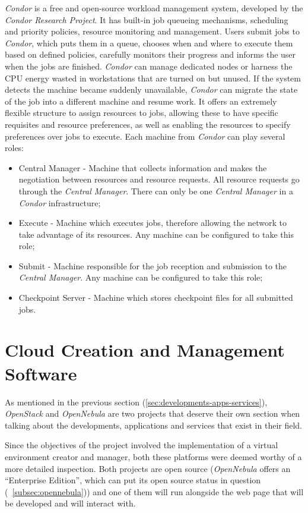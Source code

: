 \textit{Condor} is a free and open-source workload management system, developed by the \textit{Condor Research Project}.
It has built-in job queueing mechanisms, scheduling and priority policies, resource monitoring and management. Users submit jobs to \textit{Condor}, which puts them in a queue, chooses when and where to execute them based on defined policies, carefully monitors their progress and informs the user when the jobs are finished.
\textit{Condor} can manage dedicated nodes or harness the CPU energy wasted in workstations that are turned on but unused. If the system detects the machine became suddenly unavailable, \textit{Condor} can migrate the state of the job into a different machine and resume work. 
It offers an extremely flexible structure to assign resources to jobs, allowing these to have specific requisites and resource preferences, as well as enabling the resources to specify preferences over jobs to execute.
Each machine from \textit{Condor} can play several roles:
\begin{itemize}
\item Central Manager - Machine that collects information and makes the negotiation between resources and resource requests. All resource requests go through the \textit{Central Manager}. There can only be one \textit{Central Manager} in a \textit{Condor} infrastructure;
\item Execute - Machine which executes jobs, therefore allowing the network to take advantage of its resources. Any machine can be configured to take this role;
\item Submit - Machine responsible for the job reception and submission to the \textit{Central Manager}. Any machine can be configured to take this role;
\item Checkpoint Server - Machine which stores checkpoint files for all submitted jobs.\cite{jorge-ruao,condor}
\end{itemize}


\section{Cloud Creation and Management Software}\label{sec:stack-nebula}

As mentioned in the previous section (\ref{sec:developments-apps-services}), \textit{OpenStack} and \textit{OpenNebula} are two projects that deserve their own section when talking about the developments, applications and services that exist in their field. 

Since the objectives of the project involved the implementation of a virtual environment creator and manager, both these platforms were deemed worthy of a more detailed inspection. Both projects are open source (\textit{OpenNebula} offers an ``Enterprise Edition'', which can put its open source status in question (~\ref{subsec:opennebula})) and one of them will run alongside the web page that will be developed and will interact with.

